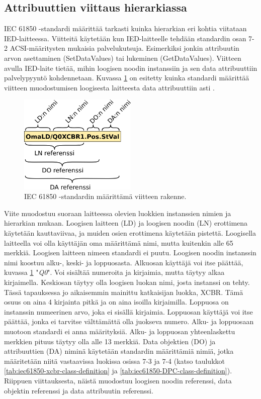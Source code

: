 \subsection{Attribuuttien viittaus hierarkiassa}
IEC 61850 -standardi määrittää tarkasti kuinka hierarkian eri kohtia viitataan IED-laitteessa. Viitteitä käytetään kun IED-laitteelle tehdään standardin osan 7-2 ACSI-määritysten mukaisia palvelukutsuja. Esimerkiksi jonkin attribuutin arvon asettaminen (SetDataValues) tai lukeminen (GetDataValues). Viitteen avulla IED-laite tietää, mihin loogisen noodin instanssiin ja sen data attribuuttiin palvelypyyntö kohdennetaan. Kuvassa \ref{fig:iec61850-data-reference} on esitetty kuinka standardi määrittää viitteen muodostumisen loogisesta laitteesta data attribuuttiin asti \cite[s.~93]{IEC61850-7-1}.

\begin{figure}
	\includegraphics[width=0.5\textwidth]{pictures/iec61850-data-reference.png}
	\caption{IEC 61850 -standardin määrittämä viitteen rakenne.}
	\label{fig:iec61850-data-reference}
\end{figure}

Viite muodostuu suoraan laitteessa olevien luokkien instanssien nimien ja hierarkian mukaan. Loogisen laitteen (LD) ja loogisen noodin (LN) erottimena käytetään kauttaviivaa, ja muiden osien erottimena käytetään pistettä. Loogisella laitteella voi olla käyttäjän oma määrittämä nimi, mutta kuitenkin alle 65 merkkiä. Loogisen laitteen nimeen standardi ei puutu. Loogisen noodin instanssin nimi koostuu alku-, keski- ja loppuosasta. Alkuosan käyttäjä voi itse päättää, kuvassa \ref{fig:iec61850-data-reference} "\emph{Q0}". Voi sisältää numeroita ja kirjaimia, mutta täytyy alkaa kirjaimella. Keskiosan täytyy olla loogisen luokan nimi, josta instanssi on tehty. Tässä tapauksessa jo aikaisemmin mainittu katkaisijan luokka, XCBR. Tämä osuus on aina 4 kirjainta pitkä ja on aina isoilla kirjaimilla. Loppuosa on instanssin numeerinen arvo, joka ei sisällä kirjaimia. Loppuosan käyttäjä voi itse päättää, jonka ei tarvitse välttämättä olla juokseva numero. Alku- ja loppuosaan muotoon standardi ei anna määrityksiä. Alku- ja loppuosan yhteenlaskettu merkkien pituus täytyy olla alle 13 merkkiä. Data objektien (DO) ja attribuuttien (DA) niminä käytetään standardin määrittämiä nimiä, jotka määritetään niitä vastaavissa luokissa osissa 7-3 ja 7-4 (katso taulukkot \ref{tab:iec61850-xcbr-class-definition} ja \ref{tab:iec61850-DPC-class-definition}). Riippuen viittauksesta, näistä muodostuu loogisen noodin referenssi, data objektin referenssi ja data attribuutin referenssi. \cite[s.~181--182]{IEC61850-7-2} \cite[s.~93--95]{IEC61850-7-1}

